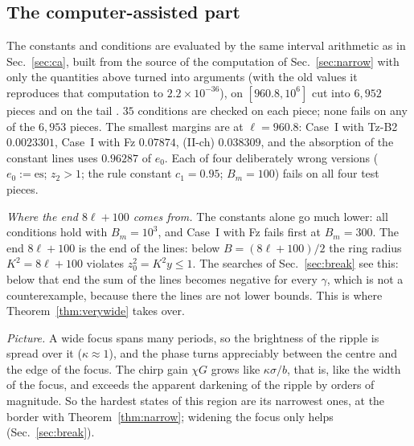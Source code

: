 \subsection{The computer-assisted part}

The constants and conditions are evaluated by the same interval arithmetic as in Sec.~\ref{sec:ca}, built from the source of the computation of Sec.~\ref{sec:narrow} with only the quantities above turned into arguments (with the old values it reproduces that computation to $2.2\times10^{-36}$), on $[960.8,10^6]$ cut into $6{,}952$ pieces and on the tail .
$35$ conditions are checked on each piece; none fails on any of the $6{,}953$ pieces.
The smallest margins are at $\ell=960.8$: Case~I with Tz-B2 $0.0023301$, Case~I with Fz $0.07874$, (II-ch) $0.038309$, and the absorption of the constant lines uses $0.96287$ of $e_0$.
Each of four deliberately wrong versions ($e_0:=\mathrm{es}$; $z_2>1$; the rule constant $c_1=0.95$; $B_m=100$) fails on all four test pieces.

\emph{Where the end $8\ell+100$ comes from.}
The constants alone go much lower: all conditions hold with $B_m=10^3$, and Case~I with Fz fails first at $B_m=300$.
The end $8\ell+100$ is the end of the lines: below $B=(8\ell+100)/2$ the ring radius $K^2=8\ell+100$ violates $z_0^2=K^2y\le1$.
The searches of Sec.~\ref{sec:break} see this: below that end the sum of the lines becomes negative for every $\gamma$, which is not a counterexample, because there the lines are not lower bounds.
This is where Theorem~\ref{thm:verywide} takes over.

\emph{Picture.}
A wide focus spans many periods, so the brightness of the ripple is spread over it ($\kappa\approx1$), and the phase turns appreciably between the centre and the edge of the focus.
The chirp gain $\chi G$ grows like $\kappa\sigma/b$, that is, like the width of the focus, and exceeds the apparent darkening of the ripple by orders of magnitude.
So the hardest states of this region are its narrowest ones, at the border with Theorem~\ref{thm:narrow}; widening the focus only helps (Sec.~\ref{sec:break}).

